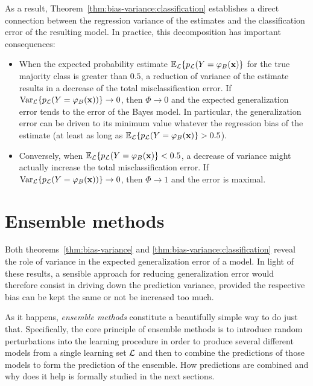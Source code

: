 As a result, Theorem~\ref{thm:bias-variance:classification} establishes a
direct connection between the regression variance of the estimates and the
classification error of the resulting model. In practice, this decomposition
has important consequences:
\begin{itemize}
\item When the expected probability estimate $\mathbb{E}_{\cal L}\{ p_{\cal L}(Y=\varphi_B(\mathbf{x}) \}$
      for the true majority class is greater than $0.5$, a reduction of
      variance of the estimate results in a decrease of the total misclassification
      error. If $\text{Var}_{\cal L}\{ p_{\cal L}(Y=\varphi_B(\mathbf{x})) \} \to 0$,
      then $\Phi \to 0$ and the expected generalization error tends to the error of the Bayes model.
      In particular, the generalization error can be driven to its minimum
      value whatever the regression bias of the estimate (at least as long as $\mathbb{E}_{\cal L}\{ p_{\cal L}(Y=\varphi_B(\mathbf{x}) \} > 0.5$).
\item Conversely, when $\mathbb{E}_{\cal L}\{ p_{\cal L}(Y=\varphi_B(\mathbf{x}) \} < 0.5$,
      a decrease of variance might actually increase the total misclassification error.
      If $\text{Var}_{\cal L}\{ p_{\cal L}(Y=\varphi_B(\mathbf{x})) \} \to 0$,
      then $\Phi \to 1$ and the error is maximal.
\end{itemize}


\section{Ensemble methods}
\label{sec:4:ensemble}

Both theorems~\ref{thm:bias-variance} and \ref{thm:bias-variance:classification}
reveal the role of variance in the expected generalization error of a model. In
light of these results, a sensible approach for reducing generalization error
would therefore consist in driving down the prediction variance, provided the
respective bias can be kept the same or not be increased too much.

As it happens, \textit{ensemble methods} constitute a beautifully simple way to
do just that. Specifically, the core principle of ensemble methods is to
introduce random perturbations into the learning procedure in order to produce
several different models from a single learning set ${\cal L}$ and then to
combine the predictions of those models to form the prediction of the ensemble.
How predictions are combined and why does it help is formally studied in the
next sections.


